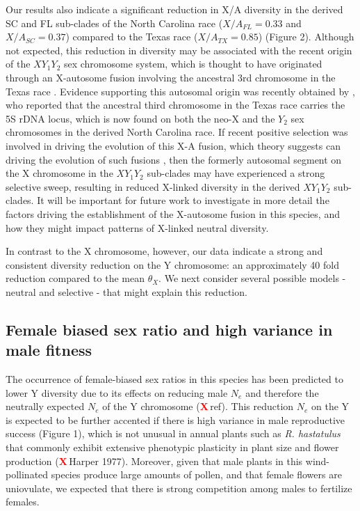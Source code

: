 \documentclass[9pt,twocolumn,twoside]{gsajnl}
\newcommand{\X}{\textcolor{red}{\bf X\,}}
\begin{document}
Our results also indicate a significant reduction in X/A diversity in the derived SC and FL sub-clades of the North Carolina race ($X/A_{FL}=0.33$ and $X/A_{SC}=0.37$) compared to the Texas race ($X/A_{TX}=0.85$) (Figure 2). Although not expected, this reduction in diversity may be associated with the recent origin of the $XY_{1}Y_{2}$ sex chromosome system, which is thought to have originated through an X-autosome fusion involving the ancestral 3rd chromosome in the Texas race \citep{smith1964evolving}. Evidence supporting this autosomal origin was recently obtained by \citep{grabowska2015}, who reported that the ancestral third chromosome in the Texas race carries the 5S rDNA locus, which is now found on both the neo-X and the $Y_{2}$ sex chromosomes in the derived North Carolina race. If recent positive selection was involved in driving the evolution of this X-A fusion, which theory suggests can driving the evolution of such fusions \citep{charlesworth1980sex}, then the formerly autosomal segment on the X chromosome in the $XY_{1}Y_{2}$ sub-clades may have experienced a strong selective sweep, resulting in reduced X-linked diversity in the derived $XY_{1}Y_{2}$ sub-clades. It will be important for future work to investigate in more detail the factors driving the establishment of the X-autosome fusion in this species, and how they might impact patterns of X-linked neutral diversity. 

In contrast to the X chromosome, however, our data indicate a strong and consistent diversity reduction on the Y chromosome: an approximately 40 fold reduction compared to the mean $\theta_{X}$. We next consider several possible models - neutral and selective - that might explain this reduction.

\subsection*{Female biased sex ratio and high variance in male fitness}

 The occurrence of female-biased sex ratios in this species has been predicted to lower Y diversity due to its effects on reducing male $N_{e}$ and therefore the neutrally expected $N_{e}$ of the Y chromosome (\X ref). This reduction $N_{e}$ on the Y is expected to be further accented if there is high variance in male reproductive success (Figure 1), which is not unusual in annual plants such as \textit{R. hastatulus} that commonly exhibit extensive phenotypic plasticity in plant size and flower production (\X Harper 1977). Moreover, given that male plants in this wind-pollinated species produce large amounts of pollen, and that female flowers are uniovulate, we expected that there is strong competition among males to fertilize females. 
 
\end{document}
